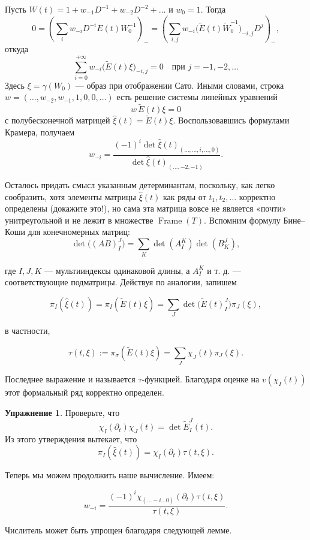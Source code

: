 \documentclass{article}
\theoremstyle{definition}
\theoremstyle{definition} %
\theoremstyle{remark}     %
\theoremstyle{definition}
\theoremstyle{definition}
\theoremstyle{definition}
\theoremstyle{definition}
\theoremstyle{definition}
\theoremstyle{definition}
\theoremstyle{definition}
\theoremstyle{definition}
\newtheorem{exercise}{Упражнение}[section]
\begin{document}
Пусть \(W(t) = 1 + w_{-1}D^{-1} + w_{-2}D^{-2} + \dots\) и \(w_0 = 1\). Тогда  
\[
0 = \left(\sum_i w_{-i}D^{-i}E(t)W_0^{-1}\right)_{-}
   = \left(\sum_{i,j} w_{-i}\bigl(\tilde{E}(t)\tilde{W}_0^{-1}\bigr)_{-i,j}D^j\right)_{-},
\]  
откуда  
\[
\sum_{i=0}^{+\infty} w_{-i}\bigl(\tilde{E}(t)\xi\bigr)_{-i,j} = 0 \quad \text{при } j = -1, -2, \dots
\]  
Здесь \(\xi = \gamma(W_0)\) — образ при отображении Сато. Иными словами, строка \(w = (\dots, w_{-2}, w_{-1}, 1, 0, 0, \dots)\) есть решение системы линейных уравнений  
\[
w\,\tilde{E}(t)\xi = 0
\]  
с полубесконечной матрицей \(\hat{\xi}(t) = \tilde{E}(t)\xi\). Воспользовавшись формулами Крамера, получаем  
\[
w_{-i} = \frac{(-1)^i \det\hat{\xi}(t)_{(\dots,\dots,i,\dots,0)}}{\det\hat{\xi}(t)_{(\dots,-2,-1)}}.
\]  

Осталось придать смысл указанным детерминантам, поскольку, как легко сообразить, хотя элементы матрицы \(\hat{\xi}(t)\) как ряды от \(t_1, t_2, \dots\) корректно определены (докажите это!), но сама эта матрица вовсе не является «почти» унитреугольной и не лежит в множестве \(\operatorname{Frame}(T)\). Вспомним формулу Бине--Коши для конечномерных матриц:  
\[
\det\bigl((AB)^J_I\bigr) = \sum_K \det(A^K_I) \det(B^J_K),
\]  

где \( I, J, K \) — мультииндексы одинаковой длины, а \( A^K_I \) и т. д. — соответствующие подматрицы. Действуя по аналогии, запишем

\[
\pi_I(\hat{\xi}(t)) = \pi_I(\tilde{E}(t)\xi) = \sum_J \det\bigl(\tilde{E}(t)^J_I\bigr) \pi_J(\xi),
\]

в частности,

\[
\tau(t, \xi) := \pi_\sigma(\tilde{E}(t)\xi) = \sum_J \chi_J(t) \pi_J(\xi).
\]

Последнее выражение и называется \(\tau\)-функцией. Благодаря оценке на \(v(\chi_I(t))\) этот формальный ряд корректно определен.

\begin{exercise}
  Проверьте, что
  \[
    \chi_I(\partial_t) \chi_J(t) = \det \tilde{E}_I^J(t).
  \]
  Из этого утверждения вытекает, что
  \[
    \pi_I(\hat{\xi}(t)) = \chi_I(\partial_t) \tau(t, \xi).
  \]
\end{exercise}

Теперь мы можем продолжить наше вычисление. Имеем:

\[
w_{-i} = \frac{(-1)^i \chi_{(\dots - i \dots 0)}(\partial_t) \tau(t, \xi)}{\tau(t, \xi)}.
\]

Числитель может быть упрощен благодаря следующей лемме.
\end{document}
